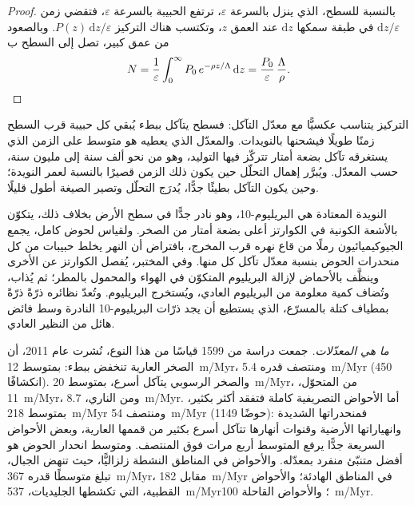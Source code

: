 \begin{proof}
بالنسبة للسطح، الذي ينزل بالسرعة $\varepsilon$، ترتفع الحبيبة بالسرعة $\varepsilon$، فتقضي زمن $\mathrm dz/\varepsilon$ في طبقة سمكها $\mathrm dz$ عند العمق $z$، وتكتسب هناك التركيز $P(z)\,\mathrm dz/\varepsilon$. وبالصعود من عمق كبير، تصل إلى السطح ب
\[
  N = \frac{1}{\varepsilon}\int_0^{\infty} P_0\,e^{-\rho z/\Lambda}\,\mathrm dz
  = \frac{P_0}{\varepsilon}\,\frac{\Lambda}{\rho}. \qedhere
\]
\end{proof}

التركيز يتناسب عكسيًّا مع معدّل التآكل: فسطح يتآكل ببطء يُبقي كل حبيبة قرب السطح زمنًا طويلًا فيشحنها بالنويدات. والمعدّل الذي يعطيه هو متوسط على الزمن الذي يستغرقه تآكل بضعة أمتار تتركّز فيها التوليد، وهو من نحو ألف سنة إلى مليون سنة، حسب المعدّل. ويُبرَّر إهمال التحلّل حين يكون ذلك الزمن قصيرًا بالنسبة لعمر النويدة؛ وحين يكون التآكل بطيئًا جدًّا، يُدرَج التحلّل وتصير الصيغة أطول قليلًا.

\begin{inthelab}
النويدة المعتادة هي البريليوم-10، وهو نادر جدًّا في سطح الأرض بخلاف ذلك، يتكوّن بالأشعة الكونية في الكوارتز أعلى بضعة أمتار من الصخر. ولقياس  لحوض كامل، يجمع الجيوكيميائيون رملًا من قاع نهره قرب المخرج، بافتراض أن النهر يخلط حبيبات من كل منحدرات الحوض بنسبة معدّل تآكل كل منها. وفي المختبر، يُفصل الكوارتز عن  الأخرى وينظَّف بالأحماض لإزالة البريليوم المتكوّن في الهواء والمحمول بالمطر؛ ثم يُذاب، وتُضاف كمية معلومة من البريليوم العادي، ويُستخرج البريليوم. وتُعدّ نظائره ذرّةً ذرّةً بمطياف كتلة بالمسرّع، الذي يستطيع أن يجد ذرّات البريليوم-10 النادرة وسط فائض هائل من النظير العادي.
\end{inthelab}

\emph{ما هي المعدّلات.} جمعت دراسة من \num{1599} قياسًا من هذا النوع، نُشرت عام 2011، أن  الصخر العارية تنخفض ببطء: بمتوسط \qty{12}{m/Myr}، ومنتصف قدره \qty{5.4}{m/Myr} (450 انكشافًا). والصخر الرسوبي يتآكل أسرع، بمتوسط \qty{20}{m/Myr}، من المتحوّل، \qty{11}{m/Myr}، ومن الناري، \qty{8.7}{m/Myr}. أما الأحواض التصريفية كاملة فتفقد أكثر بكثير، بمتوسط \qty{218}{m/Myr} ومنتصف \qty{54}{m/Myr} (\num{1149} حوضًا): فمنحدراتها الشديدة وانهياراتها الأرضية وقنوات أنهارها تتآكل أسرع بكثير من قممها العارية، وبعض الأحواض السريعة جدًّا يرفع المتوسط أربع مرات فوق المنتصف. ومتوسط انحدار الحوض هو أفضل متنبّئ منفرد بمعدّله. والأحواض في المناطق النشطة زلزاليًّا، حيث تنهض الجبال، تبلغ متوسطًا قدره \qty{367}{m/Myr}، مقابل \qty{182}{m/Myr} في المناطق الهادئة؛ والأحواض القطبية، التي تكشطها الجليديات، \qty{537}{m/Myr}؛ والأحواض القاحلة \qty{100}{m/Myr}.

